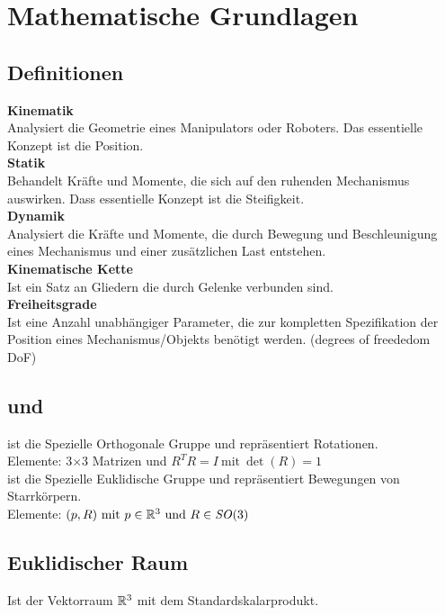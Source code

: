 

\section{Mathematische Grundlagen}

\subsection{Definitionen}
\textbf{Kinematik}\\
Analysiert die Geometrie eines Manipulators oder Roboters. Das essentielle Konzept ist die Position.\\

\textbf{Statik}\\
Behandelt Kräfte und Momente, die sich auf den ruhenden Mechanismus auswirken. Dass essentielle Konzept
ist die Steifigkeit.\\

\textbf{Dynamik}\\
Analysiert die Kräfte und Momente, die durch Bewegung und Beschleunigung eines Mechanismus und einer
zusätzlichen Last entstehen.\\

\textbf{Kinematische Kette}\\
Ist ein Satz an Gliedern die durch Gelenke verbunden sind.\\

\textbf{Freiheitsgrade}\\
Ist eine Anzahl unabhängiger Parameter, die zur kompletten Spezifikation der Position eines
Mechanismus/Objekts benötigt werden. (degrees of freededom DoF)

\subsection{\SO und \SE}
\SO{} ist die Spezielle Orthogonale Gruppe und repräsentiert Rotationen.\\
Elemente: 3\(\times\)3 Matrizen und \(R^{T}R = I\ \text{mit}\ \det(R) = 1\)\\
\SE{} ist die Spezielle Euklidische Gruppe und repräsentiert Bewegungen von Starrkörpern.\\
Elemente: \((p, R)\ \text{mit}\ p \in \mathbb{R}^3\ \text{und}\ R \in \mathit{SO}(3)\)

\subsection{Euklidischer Raum}
Ist der Vektorraum \(\mathbb{R}^3\) mit dem Standardskalarprodukt.


